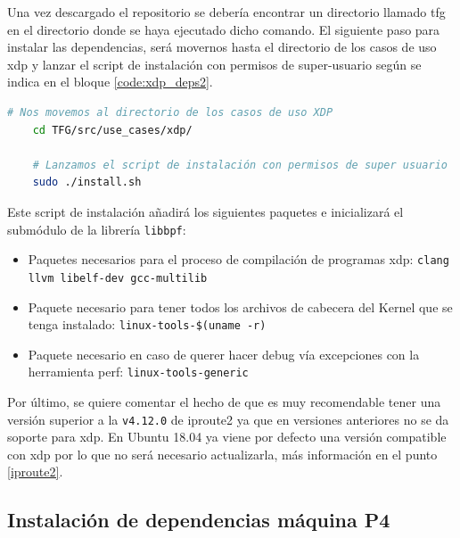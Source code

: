 \vspace{0.5cm}

Una vez descargado el repositorio se debería encontrar un directorio llamado \gls{tfg} en el directorio donde se haya ejecutado dicho comando. El siguiente paso para instalar las dependencias, será movernos hasta el directorio de los casos de uso \gls{xdp} y lanzar el script de instalación con permisos de super-usuario según se indica en el bloque \ref{code:xdp_deps2}.

\begin{lstlisting}[language= bash, style=Consola, caption={Instalación de dependencias XDP},label=code:xdp_deps2]
    # Nos movemos al directorio de los casos de uso XDP
    cd TFG/src/use_cases/xdp/
    
    # Lanzamos el script de instalación con permisos de super usuario
    sudo ./install.sh
\end{lstlisting}

\vspace{0.5cm}
Este script de instalación añadirá los siguientes paquetes e inicializará el submódulo de la librería \texttt{libbpf}:

\begin{itemize}
    \item Paquetes necesarios para el proceso de compilación de programas \gls{xdp}: \texttt{clang llvm libelf-dev gcc-multilib}
    \item Paquete necesario para tener todos los archivos de cabecera del Kernel que se tenga instalado:
          \texttt{linux-tools-\$(uname -r)}
    \item Paquete necesario en caso de querer hacer debug vía excepciones con la herramienta perf: \texttt{linux-tools-generic}
\end{itemize}

Por último, se quiere comentar el hecho de que es muy recomendable tener una versión superior a la \texttt{v4.12.0} de iproute2 ya que en versiones anteriores no se da soporte para \gls{xdp}. En Ubuntu 18.04 ya viene por defecto una versión compatible con \gls{xdp} por lo que no será necesario actualizarla, más información en el punto \ref{iproute2}.


\subsection{Instalación de dependencias máquina P4}

